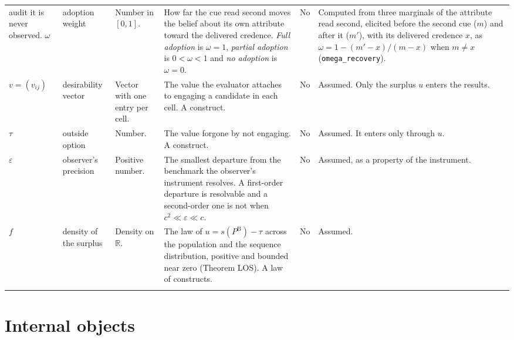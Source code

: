 \documentclass[11pt]{article}
\newcommand{\PB}{P^{\mathrm{B}}}
\newcommand{\lean}[1]{\texttt{\scriptsize #1}}
\newcommand{\mm}[6]{#1 & #2 & #3 & #4 & #5 & #6 \\ \addlinespace}
\begin{document}
\begin{longtable}{@{}P{1.6cm}P{1.9cm}P{1.8cm}P{4.1cm}P{1.2cm}P{4.1cm}@{}}
{  audit it is never observed.}
\mm{$\omega$}{adoption weight}{Number in $[0,1]$.}
  {How far the cue read second moves the belief about its own attribute toward
  the delivered credence. \emph{Full adoption} is $\omega=1$, \emph{partial
  adoption} is $0<\omega<1$ and \emph{no adoption} is $\omega=0$.}{No}
  {Computed from three marginals of the attribute read second, elicited before
  the second cue ($m$) and after it ($m'$), with its delivered credence $x$, as
  $\omega=1-(m'-x)/(m-x)$ when $m\neq x$ (\lean{omega\_recovery}).}
\mm{$v=(v_{ij})$}{desirability vector}{Vector with one entry per cell.}
  {The value the evaluator attaches to engaging a candidate in each cell. A
  construct.}{No}
  {Assumed. Only the surplus $u$ enters the results.}
\mm{$\tau$}{outside option}{Number.}
  {The value forgone by not engaging. A construct.}{No}
  {Assumed. It enters only through $u$.}
\mm{$\varepsilon$}{observer's precision}{Positive number.}
  {The smallest departure from the benchmark the observer's instrument
  resolves. A first-order departure is resolvable and a second-order one is
  not when $c^{2}\ll\varepsilon\ll c$.}{No}
  {Assumed, as a property of the instrument.}
\mm{$f$}{density of the surplus}{Density on $\mathbb R$.}
  {The law of $u=s(\PB)-\tau$ across the population and the sequence
  distribution, positive and bounded near zero (Theorem LOS). A law of
  constructs.}{No}
  {Assumed.}
\end{longtable}
\normalsize

\section*{Internal objects}
\end{document}
